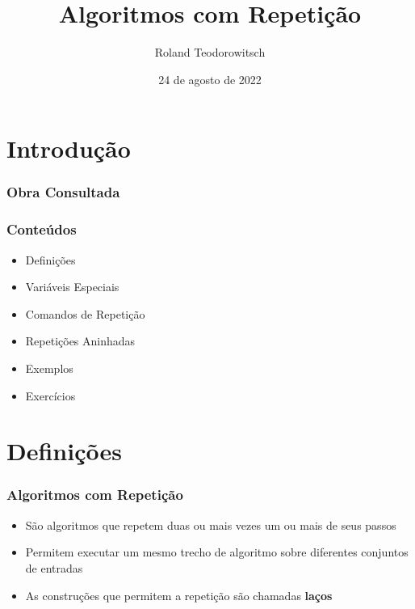 \documentclass[xcolor={dvipsnames,table},aspectratio=169]{beamer}
\title[\sc{Algoritmos com Repetição}]{Algoritmos com Repetição}
\author[Roland Teodorowitsch]{Roland Teodorowitsch}
\institute[FPROG - EP - PUCRS]{Fundamentos de Programação - Escola Politécnica - PUCRS}
\date{24 de agosto de 2022}
\begin{document}
\justifying

\begin{frame}
	\titlepage
\end{frame}

\section{Introdução}

\begin{frame}\frametitle{Obra Consultada}


\end{frame}

\begin{frame}\frametitle{Conteúdos}
\begin{itemize}
	\item Definições
	\item Variáveis Especiais
	\item Comandos de Repetição
	\item Repetições Aninhadas
	\item Exemplos
	\item Exercícios
\end{itemize}
\end{frame}

\section{Definições}

\begin{frame}[fragile]\frametitle{Algoritmos com Repetição}
\begin{itemize}
	\item São algoritmos que repetem duas ou mais vezes um ou mais de seus passos
	\item Permitem executar um mesmo trecho de algoritmo sobre diferentes conjuntos de entradas
	\item As construções que permitem a repetição são chamadas \textbf{laços}
\end{itemize}
\end{frame}
\end{document}
